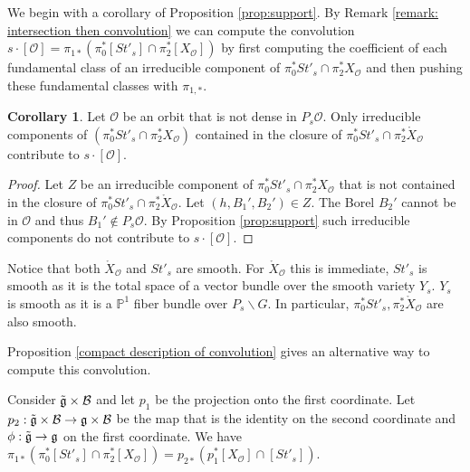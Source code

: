 \documentclass[12pt]{article}
\newcommand{\p}{\mathbb{P}}
\newcommand{\B}{\mathcal{B}}
\newcommand{\s}{\mathcal{O}}
\theoremstyle{plain}
\theoremstyle{definition}
\newtheorem{cor}[theorem]{Corollary}
\begin{document}
We begin with a corollary of Proposition \ref{prop:support}. By Remark \ref{remark: intersection then convolution} we can compute the convolution $s\cdot  [\mathcal{O}]=\pi_{1*}(\pi_0^*[St'_s]\cap \pi_2^*[{X}_\s])$ by first computing the coefficient of each fundamental class of an irreducible component of $\pi_0^*St'_s\cap \pi_2^*{X}_\s$ and then pushing these fundamental classes with $\pi_{1,*}$.  

\begin{cor}
    Let $\s$ be an orbit that is not dense in $P_s\s$.  Only irreducible components of $(\pi_0^*St'_s\cap \pi_2^*{X}_\s)$ contained in the closure of $\pi_0^*St'_s\cap \pi_2^*\mathring{X}_\s$ contribute to $s\cdot [\s]$.
\end{cor}

\begin{proof}
     Let $Z$ be an irreducible component of $\pi_0^*St'_s\cap \pi_2^*{X}_\s$ that is not contained in the closure of $\pi_0^*St'_s\cap \pi_2^*\mathring{X}_\s$. Let $(h,B_1',B_2')\in Z$. The Borel $B_2'$ cannot be in $\s$ and thus $B_1'\notin P_s\s$. By Proposition \ref{prop:support} such irreducible components do not contribute to $s\cdot [\s]$. 
\end{proof}

Notice that both $\mathring{X}_\s$ and  $St'_s$ are smooth. For $\mathring{X}_\s$ this is immediate, $St'_s$ is smooth as it is the total space of a vector bundle over the smooth variety $Y_s$. $Y_s$ is smooth as it is a $\p^1$ fiber bundle over $P_s\backslash G$. In particular, $\pi_0^*St'_s, \pi_2^*\mathring{X}_\s$ are also smooth.

Proposition \ref{compact description of convolution} gives an alternative way to compute this convolution. 

 Consider $\Tilde{\mathfrak{g}}\times \B$ and let $p_1$ be the projection onto the first coordinate. Let $p_2:\Tilde{\mathfrak{g}}\times \B\rightarrow \mathfrak{g}\times \B$ be the map that is the identity on the second coordinate and $\phi:\Tilde{\mathfrak{g}}\rightarrow \mathfrak{g}$ on the first coordinate.
 We have $\pi_{1*}(\pi_0^*[St'_s]\cap \pi_2^*[{X}_\s])=p_{2*}(p_1^*[{X}_\s]\cap [St'_s])$.
\end{document}
